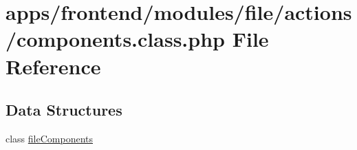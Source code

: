 \hypertarget{frontend_2modules_2file_2actions_2components_8class_8php}{\section{apps/frontend/modules/file/actions/components.class.\-php File Reference}
\label{frontend_2modules_2file_2actions_2components_8class_8php}
}
\subsection*{Data Structures}
\begin{DoxyCompactItemize}
\item 
class \hyperlink{classfile_components}{file\-Components}
\end{DoxyCompactItemize}
